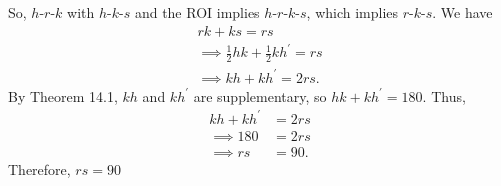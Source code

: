 \documentclass{report}
\begin{document}
    \bigbreak \noindent 
    So, $ h\text{-}r\text{-}k $ with $ h\text{-}k\text{-}s$ and the ROI implies $ h\text{-}r\text{-}k\text{-}s$, which implies $ r\text{-}k\text{-}s$. We have
    \begin{align*}
        rk + ks = rs \\
        \implies \frac{1}{2}hk + \frac{1}{2}kh^{\prime} = rs \\
        \implies kh + kh^{\prime} = 2rs
    .\end{align*}
    By Theorem 14.1, $kh$ and $kh^{\prime}$ are supplementary, so $ hk + kh^{\prime} = 180$. Thus,
    \begin{align*}
        kh + kh^{\prime} &= 2rs \\
        \implies 180 &= 2rs \\
        \implies rs &= 90
    .\end{align*}
    Therefore, $ rs = 90$ \endpf
\end{document}
